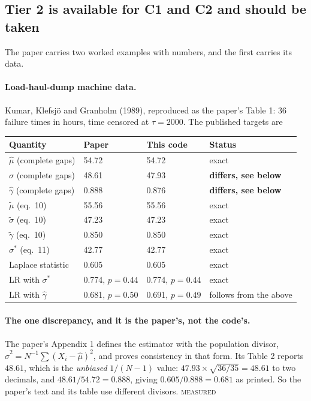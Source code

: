 \documentclass[11pt,a4paper]{article}
\newcommand{\gh}{\hat\gamma}
\newcommand{\MEASURED}{\textsc{\textcolor{green!45!black}{measured}}}
\begin{document}
\subsection{Tier 2 is available for C1 and C2 and should be taken}

The paper carries two worked examples with numbers, and the first carries its data.

\paragraph{Load-haul-dump machine data.} Kumar, Klefsjö and Granholm (1989), reproduced
as the paper's Table 1: 36 failure times in hours, time censored at $\tau=2000$. The
published targets are

\begin{center}
\small
\begin{tabular}{@{}llll@{}}
\toprule
\textbf{Quantity} & \textbf{Paper} & \textbf{This code} & \textbf{Status}\\
\midrule
$\hat\mu$ (complete gaps) & 54.72 & 54.72 & exact\\
$\hat\sigma$ (complete gaps) & 48.61 & 47.93 & \textbf{differs, see below}\\
$\gh$ (complete gaps) & 0.888 & 0.876 & \textbf{differs, see below}\\
$\tilde\mu$ (eq.~10) & 55.56 & 55.56 & exact\\
$\tilde\sigma$ (eq.~10) & 47.23 & 47.23 & exact\\
$\tilde\gamma$ (eq.~10) & 0.850 & 0.850 & exact\\
$\sigma^{*}$ (eq.~11) & 42.77 & 42.77 & exact\\
Laplace statistic & 0.605 & 0.605 & exact\\
LR with $\sigma^{*}$ & 0.774, $p=0.44$ & 0.774, $p=0.44$ & exact\\
LR with $\gh$ & 0.681, $p=0.50$ & 0.691, $p=0.49$ & follows from the above\\
\bottomrule
\end{tabular}
\end{center}

\paragraph{The one discrepancy, and it is the paper's, not the code's.}
The paper's Appendix 1 defines the estimator with the population divisor,
$\hat\sigma^2 = N^{-1}\sum(X_i - \hat\mu)^2$, and proves consistency in that form. Its
Table 2 reports $48.61$, which is the \emph{unbiased} $1/(N-1)$ value:
$47.93 \times \sqrt{36/35} = 48.61$ to two decimals, and
$48.61/54.72 = 0.888$, giving $0.605/0.888 = 0.681$ as printed. So the paper's text and
its table use different divisors. \MEASURED
\end{document}
